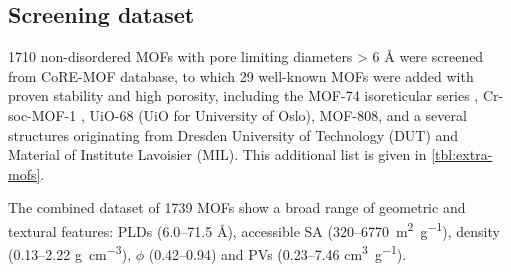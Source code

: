 \subsection{Screening dataset}\label{si-screening-dataset}

1710 non-disordered MOFs with pore limiting diameters \textgreater{} 6 Å were
screened from CoRE-MOF database, to which 29 well-known MOFs were added with
proven stability and high porosity, including the MOF-74 isoreticular series
\citep{gulcayBiocompatibleMOFsStorage2019}, Cr-soc-MOF-1
\citep{nandiRevisitingWaterSorption2019}, UiO-68 (UiO for University of Oslo),
MOF-808, \citep{soaresComputationalEvaluationChemical2019} and a several
structures originating from Dresden University of Technology (DUT) and Material
of Institute Lavoisier (MIL). This additional list is given in \cref{tbl:extra-mofs}.

The combined dataset of 1739 MOFs show a broad range of geometric and textural
features: PLDs (6.0--71.5 Å),  accessible SA
(320--\SI{6770}{\metre\squared\per\gram}), density (0.13--2.22
\si{\gram\per\centi\metre\cubed}), \(\phi\) (0.42--0.94) and PVs (0.23--7.46
\si{\centi\metre\cubed\per\gram}).


